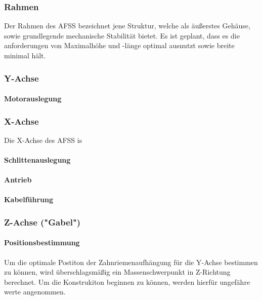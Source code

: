 \subsubsection{Rahmen}

Der Rahmen des AFSS bezeichnet jene Struktur, welche als äußerstes Gehäuse, sowie grundlegende mechanische Stabilität bietet. Es ist geplant, dass es die anforderungen von Maximalhöhe und -länge optimal ausnutzt sowie breite minimal hält. 

\subsubsection{Y-Achse}
\paragraph{Motorauslegung}

\subsubsection{X-Achse}
Die X-Achse des AFSS is 


\paragraph{Schlittenauslegung}



\paragraph{Antrieb}

\paragraph{Kabelführung}


\subsubsection{Z-Achse ("Gabel")}
\paragraph{Positionsbestimmung}

Um die optimale Postiton der Zahnriemenaufhängung für die Y-Achse bestimmen zu können, wird überschlagsmäßig ein Massenschwerpunkt in Z-Richtung berechnet. Um die Konstrukiton beginnen zu können, werden hierfür ungefähre werte angenommen.

